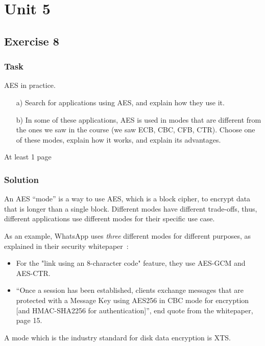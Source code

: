 \chapter{Unit 5}
\section{Exercise 8}

\subsection{Task}
AES in practice.

\begin{enumerate}
    \item[a)] Search for applications using AES, and explain how they use it.
    \item[b)] In some of these applications, AES is used in modes that are different from the ones we saw in the course (we saw ECB, CBC, CFB, CTR). Choose one of these modes, explain how it works, and explain its advantages.
\end{enumerate}

At least 1 page

\subsection{Solution}

An AES ``mode'' is a way to use AES, which is a block cipher, to encrypt data that is longer than a single block.
Different modes have different trade-offs, thus, different applications use different modes for their specific use case.

As an example, WhatsApp uses \textit{three} different modes for different purposes, as explained in their security whitepaper~\cite{whatsapp}:
\begin{itemize}
    \item For the "link using an 8-character code" feature, they use AES-GCM and AES-CTR.
    \item ``Once a session has been established, clients exchange messages that are protected with a Message Key using AES256 in CBC mode for encryption [and HMAC-SHA2256 for authentication]'', end quote from the whitepaper, page 15.
\end{itemize}

A mode which is the industry standard for disk data encryption is XTS.
